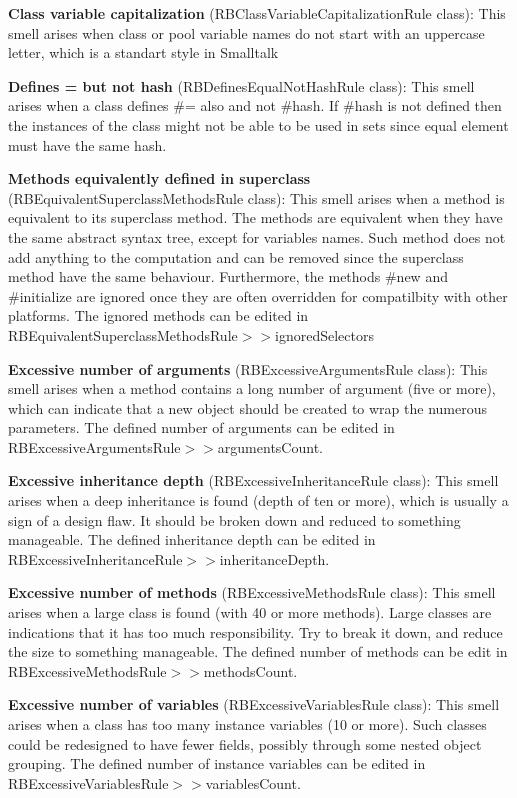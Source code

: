 \textbf{Class variable capitalization} (RBClassVariableCapitalizationRule class): This smell arises when class or pool variable names do not start with an uppercase letter, which is a standart style in Smalltalk

\textbf{Defines = but not hash} (RBDefinesEqualNotHashRule class): This smell arises when a class defines \#= also and not \#hash. If \#hash is not defined then the instances of the class might not be able to be used in sets since equal element must have the same hash.

\textbf{Methods equivalently defined in superclass} (RBEquivalentSuperclassMethodsRule class): This smell arises when a method is equivalent to its superclass method. The methods are equivalent when they have the same abstract syntax tree, except for variables names. Such method does not add anything to the computation and can be removed since the superclass method have the same behaviour. Furthermore, the methods \#new and \#initialize are ignored once they are often overridden for compatilbity with other platforms. The ignored methods can be edited in RBEquivalentSuperclassMethodsRule$>>$ignoredSelectors

\textbf{Excessive number of arguments} (RBExcessiveArgumentsRule class): This smell arises when a method contains a long number of argument (five or more), which can indicate that a new object should be created to wrap the numerous parameters. The defined number of arguments can be edited in RBExcessiveArgumentsRule$>>$argumentsCount.

\textbf{Excessive inheritance depth} (RBExcessiveInheritanceRule class): This smell arises when a deep inheritance is found (depth of ten or more), which is usually a sign of a design flaw. It should be broken down and reduced to something manageable. The defined inheritance depth can be edited in RBExcessiveInheritanceRule$>>$inheritanceDepth.

\textbf{Excessive number of methods} (RBExcessiveMethodsRule class): This smell arises when a large class is found (with 40 or more methods). Large classes are indications that it has too much responsibility. Try to break it down, and reduce the size to something manageable. The defined number of methods can be edit in RBExcessiveMethodsRule$>>$methodsCount.

\textbf{Excessive number of variables} (RBExcessiveVariablesRule class): This smell arises when a class has too many instance variables (10 or more). Such classes could be redesigned to have fewer fields, possibly through some nested object grouping. The defined number of instance variables can be edited in RBExcessiveVariablesRule$>>$variablesCount.


